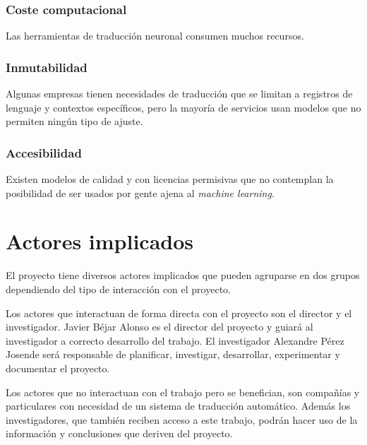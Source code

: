 \subsubsection{Coste computacional}
Las herramientas de traducción neuronal consumen muchos recursos.

\subsubsection{Inmutabilidad}
Algunas empresas tienen necesidades de traducción que se limitan a registros de
lenguaje y contextos específicos, pero la mayoría de servicios usan modelos que no
permiten ningún tipo de ajuste.

\subsubsection{Accesibilidad}
Existen modelos de calidad y con licencias permisivas que no contemplan la posibilidad de
ser usados por gente ajena al \textit{machine learning}.


\section{Actores implicados}
El proyecto tiene diversos actores implicados que pueden agruparse en dos grupos dependiendo
del tipo de interacción con el proyecto.

Los actores que interactuan de forma directa con el proyecto son el director y el investigador.
Javier Béjar Alonso es el director del proyecto y guiará al investigador a correcto desarrollo
del trabajo. El investigador Alexandre Pérez Josende será responsable de planificar, investigar,
desarrollar, experimentar y documentar el proyecto.

Los actores que no interactuan con el trabajo pero se benefician, son compañías y particulares
con necesidad de un sistema de traducción automático. Además los investigadores, que también reciben
acceso a este trabajo, podrán hacer uso de la información y conclusiones que deriven del proyecto.